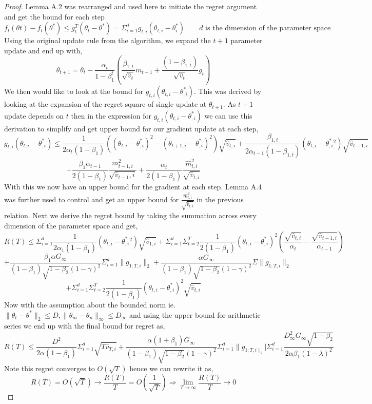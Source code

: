 \documentclass[nohyperref]{article}
\theoremstyle{plain}
\theoremstyle{definition}
\theoremstyle{remark}
\begin{document}
\begin{proof} 
Lemma A.2 was rearranged and used here to initiate the regret argument and get the bound for each step
$$f_{t}(\theta t) - f_{t}(\theta^{*}) \leq g_{t}^{T}(\theta_{t} - \theta^{*}) = \Sigma_{i=1}^{d} g_{t,i}(\theta_{t,i} - \theta^{*}_{i}) \quad \quad \text{$d$ is the dimension of the parameter space}$$
Using the original update rule from the algorithm, we expand the $t+1$ parameter update and end up with,
$$ \theta_{t+1} = \theta_{t} - \frac{\alpha_{t}}{1-\beta_{1}^{t}} \left(\frac{\beta_{1,t}}{\sqrt{\hat{v}_{t}}}m_{t-1} + \frac{(1-\beta_{1,t})}{\sqrt{\hat{v}_{t}}}g_{t} \right)
$$
We then would like to look at the bound for $g_{t,i}(\theta_{t,i} - \theta^{*}_{,i})$. This was derived by looking at the expansion of the regret square of single update at $\theta_{t+1}$. As $t+1$ update depends on $t$ then in the expression for $g_{t,i}(\theta_{t,i} - \theta^{*}_{,i})$ we can use this derivation to simplify and get upper bound for our gradient update at each step,
$$ g_{t,i}(\theta_{t,i} - \theta^{*}_{,i}) \leq \frac{1}{2 \alpha_{t}(1-\beta_{1})} \left( (\theta_{t,i} - \theta^{*}_{,i})^{2}  - (\theta_{t+1,i} - \theta^{*}_{,i})^{2} \right) \sqrt{\hat{v}_{t,i}} + \frac{\beta_{1,t}}{2\alpha_{t-1}(1-\beta_{1,t})}(\theta_{t,i} - \theta^{*}_{,i} ^{2}) \sqrt{\hat{v}_{t-1, i}}$$
$$ + \frac{\beta_{1} \alpha_{t-1}}{2(1- \beta_{1})} \frac{m^{2}_{t-1,i}}{\sqrt{\hat{v}_{t-1},i}} + \frac{\alpha_{t}}{2(1-\beta_{1})} \frac{\hat{m}_{t,i}^{2}}{\sqrt{\hat{v}_{t,i}}}$$
With this we now have an upper bound for the gradient at each step. Lemma A.4 was further used to control and get an upper bound for $\frac{\hat{m}_{t,i}^{2}}{\sqrt{\hat{v}_{t,i}}}$ in the previous relation. Next we derive the regret bound by taking the summation across every dimension of the parameter space and get,
$$R(T) \leq  \Sigma_{i=1}^{d} \frac{1}{2\alpha_{1} (1-\beta_{1})}(\theta_{t,i} - \theta^{*}_{,i} ^{2}) \sqrt{\hat{v}_{1,i}} + \Sigma_{i=1}^{d}\Sigma_{t=2}^{T}\frac{1}{2(1-\beta_{1})}(\theta_{t,i} - \theta^{*}_{,i})^2(\frac{\sqrt{\hat{v}_{t,i}}}{\alpha_{t}} - \frac{\sqrt{\hat{v}_{t-1,i}}}{\alpha_{t-1}})
$$
$$ + \frac{\beta_{1}\alpha G_{\infty}}{(1-\beta_{1}) \sqrt{1-\beta_{2}}(1-\gamma)^{2}} \Sigma_{i=1}^{d} \| g_{1:T,i} \|_{2} + \frac{\alpha G_{\infty}}{(1-\beta_{1}) \sqrt{1-\beta_{2}}(1-\gamma)^{2}} \Sigma \|g_{1:T,i} \|_{2}
$$
$$
+ \Sigma_{i=1}^{d}\Sigma_{t=2}^{T}\frac{1}{2(1-\beta_{1})}(\theta_{t,i} - \theta^{*}_{,i})^2 \sqrt{\hat{v}_{t,i}}
$$
Now with the assumption about the bounded norm ie. $\| \theta_{t} - \theta^{*} \|_{2} \leq D, \| \theta_{m} - \theta_{n} \|_{\infty} \leq D_{\infty}$ and using the upper bound for arithmetic series we end up with the final bound for regret as,
$$R(T) \leq \frac{D^2}{2\alpha(1-\beta_{1})} \Sigma_{i=1}^{d} \sqrt{T\hat{v}_{T,i}} + \frac{\alpha(1+\beta_{1})G_{\infty}}{(1-\beta_{1})\sqrt{1-\beta_{2}} (1-\gamma)^{2}} \Sigma_{i=1}^{d} \| g_{1:T,i \|_{2}} | \Sigma_{i=1}^{d} \frac{D_{\infty}^{2} G_{\infty}\sqrt{1-\beta_{2}} }{ 2 \alpha \beta_{1} (1-\lambda)^{2}}$$
Note this regret converges to $O(\sqrt{T})$ hence we can rewrite it as,
$$R(T)=O(\sqrt{T}) \rightarrow \frac{R(T)}{T} = O(\frac{1}{\sqrt{T}}) \Longrightarrow \lim_{T\rightarrow\infty}\frac{R(T)}{T} \to 0 $$
\end{proof}
\end{document}
